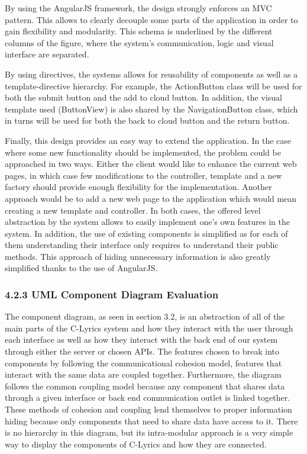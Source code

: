 \documentclass[]{article}
\begin{document}
By using the AngularJS framework, the design strongly enforces an MVC
pattern. This allows to clearly decouple some parts of the application
in order to gain flexibility and modularity. This schema is underlined
by the different columns of the figure, where the system's
communication, logic and visual interface are separated.

By using directives, the systems allows for reusability of components as
well as a template-directive hierarchy. For example, the ActionButton
class will be used for both the submit button and the add to cloud
button. In addition, the visual template used (ButtonView) is also
shared by the NavigationButton class, which in turns will be used for
both the back to cloud button and the return button.

Finally, this design provides an easy way to extend the application. In
the case where some new functionality should be implemented, the problem
could be approached in two ways. Either the client would like to enhance
the current web pages, in which case few modifications to the
controller, template and a new factory should provide enough flexibility
for the implementation. Another approach would be to add a new web page
to the application which would mean creating a new template and
controller. In both cases, the offered level abstraction by the system
allows to easily implement one's own features in the system. In
addition, the use of existing components is simplified as for each of
them understanding their interface only requires to understand their
public methods. This approach of hiding unnecessary information is also
greatly simplified thanks to the use of AngularJS.

\subsubsection{4.2.3 UML Component Diagram
Evaluation}\label{uml-component-diagram-evaluation}

The component diagram, as seen in section 3.2, is an abstraction of all
of the main parts of the C-Lyrics system and how they interact with the
user through each interface as well as how they interact with the back
end of our system through either the server or chosen APIs. The features
chosen to break into components by following the communicational
cohesion model, features that interact with the same data are coupled
together. Furthermore, the diagram follows the common coupling model
because any component that shares data through a given interface or back
end communication outlet is linked together. These methods of cohesion
and coupling lend themselves to proper information hiding because only
components that need to share data have access to it. There is no
hierarchy in this diagram, but its intra-modular approach is a very
simple way to display the components of C-Lyrics and how they are
connected.
\end{document}
